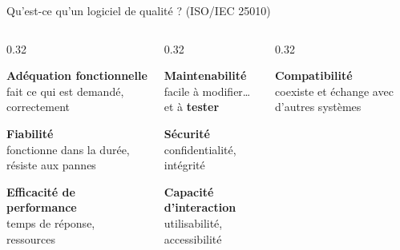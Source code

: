 \documentclass[aspectratio=169,10pt]{beamer}
\begin{document}
\begin{frame}{Qu'est-ce qu'un logiciel de qualité ? (ISO/IEC 25010)}
  \small
  \begin{columns}[T]
    \begin{column}{0.32\textwidth}
      \begin{datacard}
        \textbf{\color{qaaccent}Adéquation fonctionnelle}\\[-0.5mm]
        {\scriptsize\color{qamuted} fait ce qui est demandé, correctement}
      \end{datacard}
      \begin{datacard}
        \textbf{\color{qaaccent}Fiabilité}\\[-0.5mm]
        {\scriptsize\color{qamuted} fonctionne dans la durée, résiste aux pannes}
      \end{datacard}
      \begin{datacard}
        \textbf{Efficacité de performance}\\[-0.5mm]
        {\scriptsize\color{qamuted} temps de réponse, ressources}
      \end{datacard}
    \end{column}
    \begin{column}{0.32\textwidth}
      \begin{datacard}
        \textbf{\color{qaaccent}Maintenabilité}\\[-0.5mm]
        {\scriptsize\color{qamuted} facile à modifier\ldots{} et à \textbf{tester}}
      \end{datacard}
      \begin{datacard}
        \textbf{Sécurité}\\[-0.5mm]
        {\scriptsize\color{qamuted} confidentialité, intégrité}
      \end{datacard}
      \begin{datacard}
        \textbf{Capacité d'interaction}\\[-0.5mm]
        {\scriptsize\color{qamuted} utilisabilité, accessibilité}
      \end{datacard}
    \end{column}
    \begin{column}{0.32\textwidth}
      \begin{datacard}
        \textbf{Compatibilité}\\[-0.5mm]
        {\scriptsize\color{qamuted} coexiste et échange avec d'autres systèmes}
      \end{datacard}
      \begin{datacard}

\end{datacard}
\end{column}
\end{columns}
\end{frame}
\end{document}
